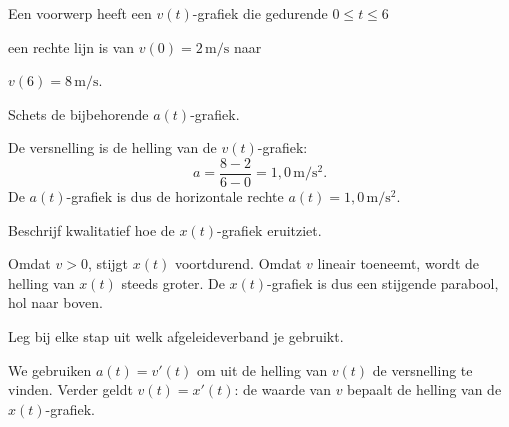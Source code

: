 \documentclass{ximera}
\begin{document}
\begin{oefening}{\oefU\ESS}

Een voorwerp heeft een $v(t)$-grafiek die gedurende $0\leq t\leq6$

een rechte lijn is van $v(0)=2\,\mathrm{m/s}$ naar

$v(6)=8\,\mathrm{m/s}$.

\begin{question}

Schets de bijbehorende $a(t)$-grafiek.

\begin{oplossing}
De versnelling is de helling van de \(v(t)\)-grafiek:
\[a=\frac{8-2}{6-0}=1,0\,\mathrm{m/s^2}.\]
De \(a(t)\)-grafiek is dus de horizontale rechte \(a(t)=1,0\,\mathrm{m/s^2}\).
\end{oplossing}

\end{question}

\begin{question}

Beschrijf kwalitatief hoe de $x(t)$-grafiek eruitziet.

\begin{oplossing}
Omdat \(v>0\), stijgt \(x(t)\) voortdurend. Omdat \(v\) lineair toeneemt, wordt de helling van \(x(t)\) steeds groter. De \(x(t)\)-grafiek is dus een stijgende parabool, hol naar boven.
\end{oplossing}

\end{question}

\begin{question}

Leg bij elke stap uit welk afgeleideverband je gebruikt.

\begin{oplossing}
We gebruiken \(a(t)=v'(t)\) om uit de helling van \(v(t)\) de versnelling te vinden. Verder geldt \(v(t)=x'(t)\): de waarde van \(v\) bepaalt de helling van de \(x(t)\)-grafiek.
\end{oplossing}

\end{question}

\end{oefening}



\end{document}
